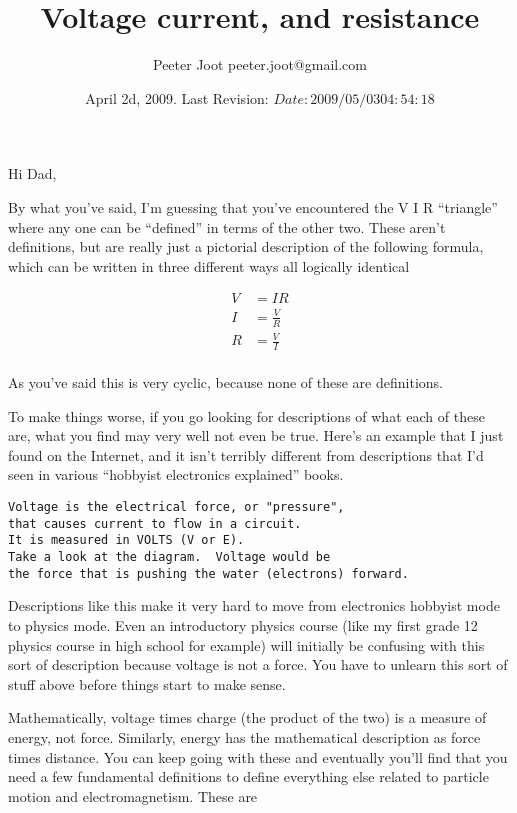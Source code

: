 \documentclass{article}
\title{ Voltage current, and resistance }
\author{Peeter Joot \quad peeter.joot@gmail.com }
\date{ April 2d, 2009.  Last Revision: $Date: 2009/05/03 04:54:18 $ }
\begin{document}
\maketitle{}

Hi Dad,

By what you've said, I'm guessing that you've encountered the V I R ``triangle'' where any one can be ``defined'' in terms of the other two.
These aren't definitions, but are really
just a pictorial description of the following formula, which can be written in three different ways all logically identical

\begin{align*}
V &= I R \\
I &= \frac{V}{R} \\
R &= \frac{V}{I} \\
\end{align*}

As you've said this is very cyclic, because none of these are definitions.

To make things worse, if you go looking for descriptions of what each of these are, what you find may very well not even be true.
Here's an example that I just found on the Internet, and it isn't terribly different from descriptions that I'd seen in various
``hobbyist electronics explained'' books.

\begin{lstlisting}
Voltage is the electrical force, or "pressure",
that causes current to flow in a circuit.
It is measured in VOLTS (V or E). 
Take a look at the diagram.  Voltage would be
the force that is pushing the water (electrons) forward.
\end{lstlisting}

Descriptions like this make it very hard to move from electronics hobbyist mode to physics mode.  Even an introductory
physics course (like my first grade 12 physics course in high school for example) will initially be confusing with this sort of description because voltage is not a force.  You have to unlearn this sort of stuff above before things start to make sense.

Mathematically, voltage times charge (the product of the two) is a measure of energy, not force.
Similarly, energy has the mathematical description as force times distance.  You can keep going with these and
eventually you'll find that you need a few fundamental definitions to define everything else related to particle motion 
and electromagnetism.  These are
\end{document}
